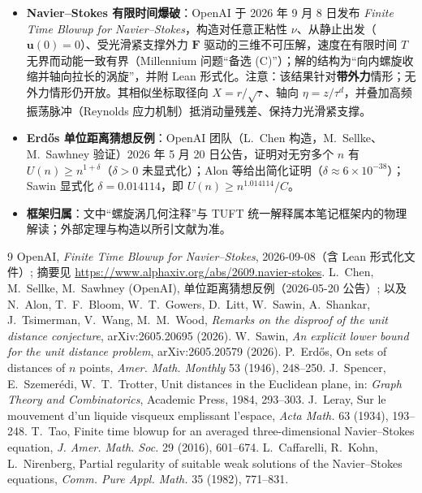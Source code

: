 \documentclass[11pt,a4paper]{article}
\newcommand{\bu}{\bm{u}}
\newcommand{\bF}{\bm{F}}
\theoremstyle{remark}
\begin{document}
\begin{itemize}
\item \textbf{Navier--Stokes 有限时间爆破}：OpenAI 于 2026 年 9 月 8 日发布 \emph{Finite Time Blowup for Navier--Stokes}，构造对任意正粘性 $\nu$、从静止出发（$\bu(0)=0$）、受光滑紧支撑外力 $\bF$ 驱动的三维不可压解，速度在有限时间 $T$ 无界而动能一致有界（Millennium 问题“备选 (C)”）；解的结构为“向内螺旋收缩并轴向拉长的涡旋”，并附 Lean 形式化。注意：该结果针对\textbf{带外力}情形；无外力情形仍开放。其相似坐标取径向 $X=r/\sqrt{\tau}$、轴向 $\eta=z/\tau^{d}$，并叠加高频振荡脉冲（Reynolds 应力机制）抵消动量残差、保持力光滑紧支撑。
\item \textbf{Erd\H{o}s 单位距离猜想反例}：OpenAI 团队（L.~Chen 构造，M.~Sellke、M.~Sawhney 验证）2026 年 5 月 20 日公告，证明对无穷多个 $n$ 有 $U(n)\ge n^{1+\delta}$（$\delta>0$ 未显式化）；Alon 等给出简化证明（$\delta\approx6\times10^{-38}$）；Sawin 显式化 $\delta=0.014114$，即 $U(n)\ge n^{1.014114}/C$。
\item \textbf{框架归属}：文中“螺旋涡几何注释”与 TUFT 统一解释属本笔记框架内的物理解读；外部定理与构造以所引文献为准。
\end{itemize}

\begin{thebibliography}{9}
 OpenAI, \emph{Finite Time Blowup for Navier--Stokes}, 2026-09-08（含 Lean 形式化文件）; 摘要见 \url{https://www.alphaxiv.org/abs/2609.navier-stokes}.
 L.~Chen, M.~Sellke, M.~Sawhney (OpenAI), 单位距离猜想反例（2026-05-20 公告）; 以及 N.~Alon, T.~F.~Bloom, W.~T.~Gowers, D.~Litt, W.~Sawin, A.~Shankar, J.~Tsimerman, V.~Wang, M.~M.~Wood, \emph{Remarks on the disproof of the unit distance conjecture}, arXiv:2605.20695 (2026).
 W.~Sawin, \emph{An explicit lower bound for the unit distance problem}, arXiv:2605.20579 (2026).
 P.~Erd\H{o}s, On sets of distances of $n$ points, \emph{Amer. Math. Monthly} 53 (1946), 248--250.
 J.~Spencer, E.~Szemer\'edi, W.~T.~Trotter, Unit distances in the Euclidean plane, in: \emph{Graph Theory and Combinatorics}, Academic Press, 1984, 293--303.
 J.~Leray, Sur le mouvement d'un liquide visqueux emplissant l'espace, \emph{Acta Math.} 63 (1934), 193--248.
 T.~Tao, Finite time blowup for an averaged three-dimensional Navier--Stokes equation, \emph{J. Amer. Math. Soc.} 29 (2016), 601--674.
 L.~Caffarelli, R.~Kohn, L.~Nirenberg, Partial regularity of suitable weak solutions of the Navier--Stokes equations, \emph{Comm. Pure Appl. Math.} 35 (1982), 771--831.
\end{thebibliography}
\end{document}
